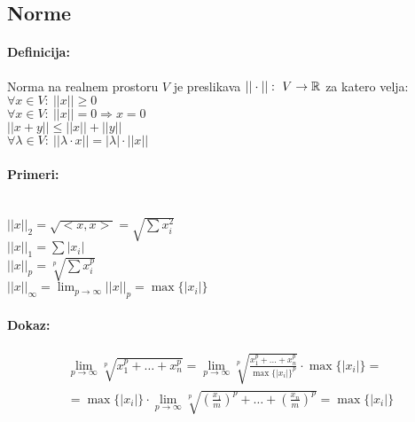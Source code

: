 \subsection{Norme}
\paragraph{Definicija:} Norma na realnem prostoru $V$ je preslikava $||\cdot||:\ V \rightarrow \mathbb{R}$ za katero velja:\\
\indent $\forall x \in V:\ ||x|| \geq 0$\\
\indent $\forall x \in V:\ ||x|| = 0 \Rightarrow x=0$\\
\indent $||x + y|| \leq ||x|| + || y || $\\
\indent $\forall \lambda \in V:\ ||\lambda \cdot x|| = |\lambda| \cdot ||x||$

\paragraph{Primeri:}\ \\
\indent $||x||_2 = \sqrt{<x, x>} = \sqrt{\sum x_i^2}$\\
\indent $||x||_1 = \sum |x_i|$\\
\indent $||x||_p = \sqrt[p]{\sum x_i^p}$\\
\indent $||x||_\infty = \lim_{p\rightarrow \infty}||x||_p = \max \{|x_i|\}$

\paragraph{Dokaz:}
\[\begin{split} \lim_{p\rightarrow \infty} \sqrt[p]{x_1^p + \dots + x_n^p} = 
\lim_{p\rightarrow \infty} \sqrt[p]{\frac{x_1^p + \dots + x_n^p}{\max\{|x_i|\}^p}}  \cdot \max \{|x_i|\} =\\
=\max\{|x_i|\}\cdot \lim_{p\rightarrow \infty} \sqrt[p]{(\frac{x_1}{m})^p + \dots + (\frac{x_n}{m})^p} = \max \{|x_i|\}\end{split}\]





















